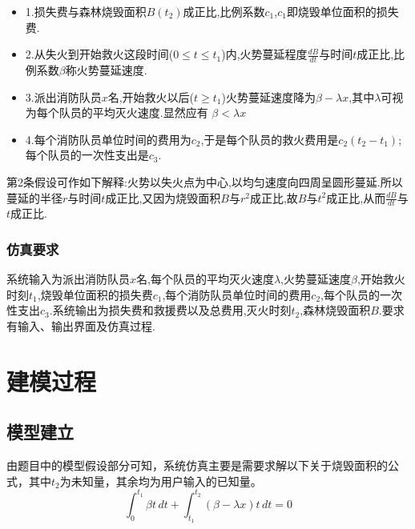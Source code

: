 \documentclass[UTF8]{article}
\begin{document}
        \begin{itemize}
            \item[]
            1.损失费与森林烧毁面积$B(t_2)$成正比,比例系数$c_1$,$c_1$即烧毁单位面积的损失费.

            \item[]
            2.从失火到开始救火这段时间($0 \leqslant t \leqslant t_1$)内,火势蔓延程度$\frac{dB}{dt}$与时间$t$成正比,比例系数$\beta$称火势蔓延速度.

            \item[]
            3.派出消防队员$x$名,开始救火以后($t \geqslant t_1$)火势蔓延速度降为$\beta - \lambda x$,其中$\lambda$可视为每个队员的平均灭火速度.显然应有 $\beta < \lambda x$

            \item[]
            4.每个消防队员单位时间的费用为$c_2$,于是每个队员的救火费用是$c_2(t_2-t_1)$;每个队员的一次性支出是$c_3$.
        \end{itemize}


        第2条假设可作如下解释:火势以失火点为中心,以均匀速度向四周呈圆形蔓延.所以蔓延的半径$r$与时间$t$成正比,又因为烧毁面积$B$与$r^2$成正比,故$B$与$t^2$成正比,从而$\frac{dB}{dt}$与$t$成正比.

    \subsubsection{仿真要求}
        
        系统输入为派出消防队员$x$名,每个队员的平均灭火速度$\lambda$,火势蔓延速度$\beta$,开始救火时刻$t_1$,烧毁单位面积的损失费$c_1$,每个消防队员单位时间的费用$c_2$,每个队员的一次性支出$c_3$.系统输出为损失费和救援费以及总费用,灭火时刻$t_2$,森林烧毁面积$B$.要求有输入、输出界面及仿真过程.
        



    \section{建模过程}
        \subsection{模型建立}
        由题目中的模型假设部分可知，系统仿真主要是需要求解以下关于烧毁面积的公式，其中$t_2$为未知量，其余均为用户输入的已知量。
        $$\int_{0}^{t_1}\beta t \,dt + \int_{t_1}^{t_2}(\beta - \lambda x)t \,dt = 0 $$
        
\end{document}
